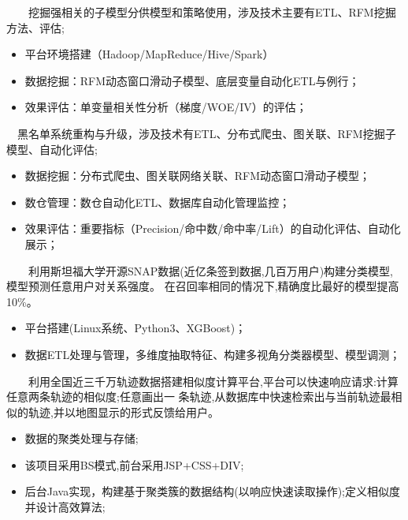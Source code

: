 \documentclass{resume}
\begin{document}
{\ \ \ \ 挖掘强相关的子模型分供模型和策略使用，涉及技术主要有ETL、RFM挖掘方法、评估;}
\begin{itemize}
  \item 平台环境搭建（Hadoop/MapReduce/Hive/Spark）
  \item 数据挖掘：RFM动态窗口滑动子模型、底层变量自动化ETL与例行；
  \item 效果评估：单变量相关性分析（梯度/WOE/IV）的评估；
\end{itemize}
\medskip

{\ \ 黑名单系统重构与升级，涉及技术有ETL、分布式爬虫、图关联、RFM挖掘子模型、自动化评估;}
\begin{itemize}
  \item 数据挖掘：分布式爬虫、图关联网络关联、RFM动态窗口滑动子模型；
  \item 数仓管理：数仓自动化ETL、数据库自动化管理监控；
  \item 效果评估：重要指标（Precision/命中数/命中率/Lift）的自动化评估、自动化展示；
\end{itemize}
\medskip


{\ \ \ \ 利用斯坦福大学开源SNAP数据(近亿条签到数据,几百万用户)构建分类模型,模型预测任意用户对关系强度。
在召回率相同的情况下,精确度比最好的模型提高10\%。}
\begin{itemize}
  \item 平台搭建(Linux系统、Python3、XGBoost)；
  \item 数据ETL处理与管理，多维度抽取特征、构建多视角分类器模型、模型调测；
\end{itemize}
\medskip


{\ \ \ \ 利用全国近三千万轨迹数据搭建相似度计算平台,平台可以快速响应请求:计算任意两条轨迹的相似度;任意画出一
条轨迹,从数据库中快速检索出与当前轨迹最相似的轨迹,并以地图显示的形式反馈给用户。}
\begin{itemize}
  \item 数据的聚类处理与存储;
  \item 该项目采用BS模式,前台采用JSP+CSS+DIV;
  \item 后台Java实现，构建基于聚类簇的数据结构(以响应快速读取操作);定义相似度并设计高效算法;
\end{itemize}
\medskip
\end{document}
